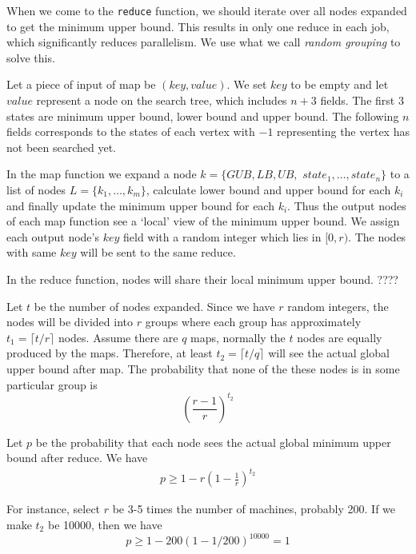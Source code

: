     When we come to the \texttt{reduce} function, we should iterate over all nodes expanded to get the minimum upper bound. This results in only one reduce in each job, which significantly {\color{red} reduces} parallelism. We use what we call \textit{random grouping} to solve this.

    Let a piece of input of map be $(key, value)$. We set $key$ to be empty and let $value$ represent a node on the search tree, which includes $n+3$ fields. The first $3$ states are minimum upper bound, lower bound and upper bound. The following $n$ fields corresponds to the states of each vertex with $-1$ representing the vertex has not been searched yet.

    In the map function we expand a node $k=\{GUB, LB, UB,$ $state_1, \dots, state_n\}$ to a list of nodes $L=\{k_1, \dots, k_m\}$, calculate lower bound and upper bound for each $k_i$ and finally update the minimum upper bound for each $k_i$. Thus the output nodes of each map function see a `local' view of the minimum upper bound. We assign each output node's $key$ field with a random integer which lies in $[0, r)$. The nodes with same $key$ will be sent to the same reduce.

    In the reduce function, nodes will share their local minimum upper bound. {\color{red}????}

    Let $t$ be the number of nodes expanded. Since we have $r$ random integers, the nodes will be divided into $r$ groups where each group has approximately $t_1=\lceil t/r \rceil$ nodes. Assume there are $q$ maps, normally the $t$ nodes are equally produced by the maps. Therefore, at least $t_2=\lceil t/q \rceil$ will see the actual global upper bound after map. The probability that none of the these nodes is in some particular group is
    \[
        \left(\frac{r-1}{r}\right)^{t_2}
    \]

    Let $p$ be the probability that each node sees the actual global minimum upper bound after reduce. We have
    \begin{align*}
        p \geq 1-r\left(1-\frac{1}{r}\right)^{t_2}
    \end{align*}

    For instance, select $r$ be 3-5 times the number of machines, probably 200. If we make $t_2$ be 10000, then we have
    \[p\geq 1-200(1-1/200)^{10000}=1\]
